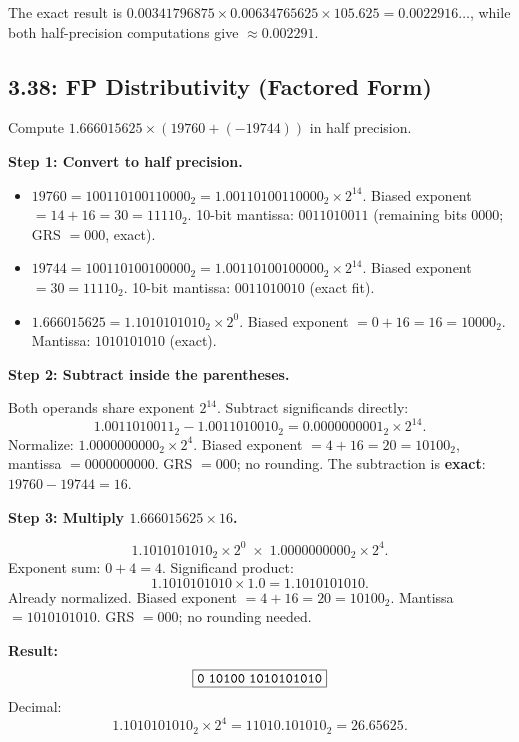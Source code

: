 The exact result is $0.00341796875 \times 0.00634765625 \times 105.625
= 0.0022916\ldots$, while both half-precision computations give
$\approx 0.002291$.

\subsection*{3.38: FP Distributivity (Factored Form)}
\hypertarget{sol-3.38}{}

Compute $1.666015625 \times (19760 + (-19744))$ in half precision.

\medskip\noindent\textbf{Step 1: Convert to half precision.}

\begin{itemize}
  \item $19760 = 100110100110000_2 = 1.00110100110000_2 \times 2^{14}$.
        Biased exponent $= 14 + 16 = 30 = 11110_2$.
        10-bit mantissa: $0011010011$ (remaining bits $0000$; GRS $= 000$, exact).
  \item $19744 = 100110100100000_2 = 1.00110100100000_2 \times 2^{14}$.
        Biased exponent $= 30 = 11110_2$.
        10-bit mantissa: $0011010010$ (exact fit).
  \item $1.666015625 = 1.1010101010_2 \times 2^{0}$.
        Biased exponent $= 0 + 16 = 16 = 10000_2$.
        Mantissa: $1010101010$ (exact).
\end{itemize}

\noindent\textbf{Step 2: Subtract inside the parentheses.}

Both operands share exponent $2^{14}$.  Subtract significands directly:
\[
  1.0011010011_2 - 1.0011010010_2 = 0.0000000001_2 \times 2^{14}.
\]
Normalize: $1.0000000000_2 \times 2^{4}$.
Biased exponent $= 4 + 16 = 20 = 10100_2$, mantissa $= 0000000000$.
GRS $= 000$; no rounding.  The subtraction is \textbf{exact}: $19760 - 19744 = 16$.

\medskip\noindent\textbf{Step 3: Multiply $1.666015625 \times 16$.}

\[
  1.1010101010_2 \times 2^{0} \;\times\; 1.0000000000_2 \times 2^{4}.
\]
Exponent sum: $0 + 4 = 4$.  Significand product:
\[
  1.1010101010 \times 1.0 = 1.1010101010.
\]
Already normalized.  Biased exponent $= 4 + 16 = 20 = 10100_2$.
Mantissa $= 1010101010$.  GRS $= 000$; no rounding needed.

\medskip\noindent\textbf{Result:}
\[
  \boxed{\texttt{0\;10100\;1010101010}}
\]
Decimal:
\[
  1.1010101010_2 \times 2^4 = 11010.101010_2 = \mathbf{26.65625}.
\]

